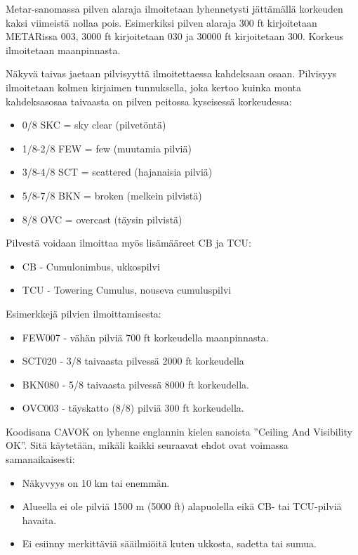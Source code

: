 Metar-sanomassa pilven alaraja ilmoitetaan lyhennetysti jättämällä korkeuden kaksi viimeistä nollaa pois. Esimerkiksi pilven alaraja 300 ft kirjoitetaan METARissa 003, 3000 ft kirjoitetaan 030 ja 30000 ft kirjoitetaan 300. Korkeus ilmoitetaan maanpinnasta. 


Näkyvä taivas jaetaan pilvisyyttä ilmoitettaessa kahdeksaan osaan. Pilvisyys ilmoitetaan kolmen kirjaimen tunnuksella, joka kertoo kuinka monta kahdeksasosaa taivaasta on pilven peitossa kyseisessä korkeudessa: 

\begin{itemize}
\item  0/8 SKC = sky clear (pilvetöntä) 
\item  1/8-2/8 FEW = few (muutamia pilviä)  
\item  3/8-4/8 SCT = scattered (hajanaisia pilviä)  
\item  5/8-7/8 BKN = broken (melkein pilvistä)  
\item  8/8 OVC = overcast (täysin pilvistä) 
\end{itemize}

Pilvestä voidaan ilmoittaa myös lisämääreet CB ja TCU: 

\begin{itemize}
\item  CB - Cumulonimbus, ukkospilvi 
\item  TCU - Towering Cumulus, nouseva cumuluspilvi 
\end{itemize}

Esimerkkejä pilvien ilmoittamisesta: 

\begin{itemize}
\item  FEW007 - vähän pilviä 700 ft korkeudella maanpinnasta. 
\item  SCT020 - 3/8 taivaasta pilvessä 2000 ft korkeudella 
\item  BKN080 - 5/8 taivaasta pilvessä 8000 ft korkeudella. 
\item  OVC003 - täyskatto (8/8) pilviä 300 ft korkeudella. 
\end{itemize}

Koodisana CAVOK on lyhenne englannin kielen sanoista ''Ceiling And Visibility OK''. Sitä käytetään, mikäli kaikki seuraavat ehdot ovat voimassa samanaikaisesti:  

\begin{itemize}
\item  Näkyvyys on 10 km tai enemmän. 
\item  Alueella ei ole pilviä 1500 m (5000 ft) alapuolella eikä CB- tai TCU-pilviä havaita.  
\item  Ei esiinny merkittäviä sääilmiöitä kuten ukkosta, sadetta tai sumua. 
\end{itemize}
